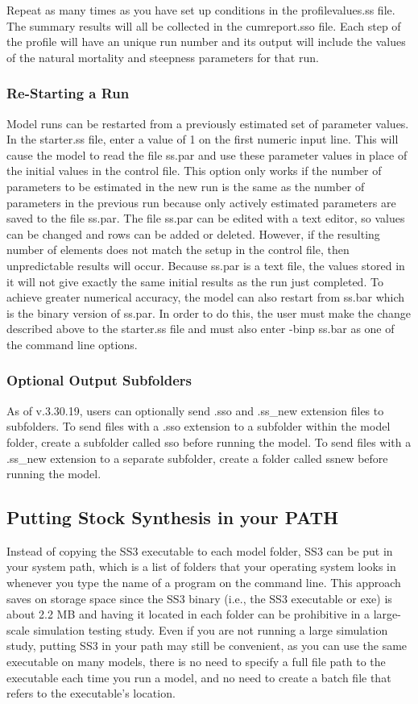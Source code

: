 Repeat as many times as you have set up conditions in the profilevalues.ss file.
The summary results will all be collected in the cumreport.sso file. Each step of the profile will have an unique run number and its output will include the values of the natural mortality and steepness parameters for that run.

\subsubsection{Re-Starting a Run}
Model runs can be restarted from a previously estimated set of parameter values. In the starter.ss file, enter a value of 1 on the first numeric input line. This will cause the model to read the file ss.par and use these parameter values in place of the initial values in the control file. This option only works if the number of parameters to be estimated in the new run is the same as the number of parameters in the previous run because only actively estimated parameters are saved to the file ss.par. The file ss.par can be edited with a text editor, so values can be changed and rows can be added or deleted. However, if the resulting number of elements does not match the setup in the control file, then unpredictable results will occur. Because ss.par is a text file, the values stored in it will not give exactly the same initial results as the run just completed. To achieve greater numerical accuracy, the model can also restart from ss.bar which is the binary version of ss.par. In order to do this, the user must make the change described above to the starter.ss file and must also enter -binp ss.bar as one of the command line options.

\subsubsection{Optional Output Subfolders}
As of v.3.30.19, users can optionally send .sso and .ss\_new extension files to subfolders. To send files with a .sso extension to a subfolder within the model folder, create a subfolder called sso before running the model. To send files with a .ss\_new extension to a separate subfolder, create a folder called ssnew before running the model.

\subsection{Putting Stock Synthesis in your PATH}

Instead of copying the SS3 executable to each model folder, SS3 can be put in your system path, which is a list of folders that your operating system looks in whenever you type the name of a program on the command line. This approach saves on storage space since the SS3 binary (i.e., the SS3 executable or exe) is about 2.2 MB and having it located in each folder can be prohibitive in a large-scale simulation testing study. Even if you are not running a large simulation study, putting SS3 in your path may still be convenient, as you can use the same executable on many models, there is no need to specify a full file path to the executable each time you run a model, and no need to create a batch file that refers to the executable's location.

